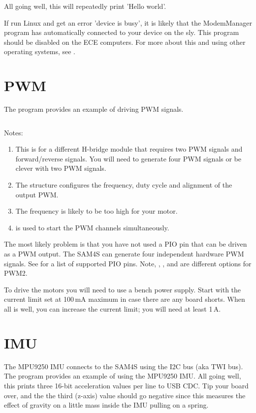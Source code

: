 All going well, this will repeatedly print 'Hello world'.

If run Linux and get an error 'device is busy', it is likely that the
ModemManager program has automatically connected to your device on the
sly. This program should be disabled on the ECE computers. For more
about this and using other operating systems, see .

\section{PWM}
\label{pwm-test}

The program  provides an
example of driving PWM signals.

\inputminted{C}{../../src/test-apps/pwm_test2/pwm_test2.c}

Notes:
%
\begin{enumerate}
\item
  This is for a different H-bridge module that requires two PWM signals
  and forward/reverse signals. You will need to generate four PWM
  signals or be clever with two PWM signals.
\item
  The  structure configures the frequency, duty
  cycle and alignment of the output PWM.
\item The frequency is likely to be too high for your motor.
\item {} is used to start the PWM channels simultaneously.
\end{enumerate}

The most likely problem is that you have not used a PIO pin that can
be driven as a PWM output. The SAM4S can generate four independent
hardware PWM signals. See  for a list of
supported PIO pins. Note, , , and  are
different options for PWM2.

To drive the motors you will need to use a bench power supply. Start
with the current limit set at 100\,mA maximum in case there are any
board shorts.  When all is well, you can increase the current limit;
you will need at least 1\,A.

\section{IMU}
\label{imu-test}

The MPU9250 IMU connects to the SAM4S using the I2C bus (aka TWI bus).
The program  provides an
example of using the MPU9250 IMU.  All going well, this prints three
16-bit acceleration values per line to USB CDC. Tip your board over,
and the the third (z-axis) value should go negative since this
measures the effect of gravity on a little mass inside the IMU pulling
on a spring.

